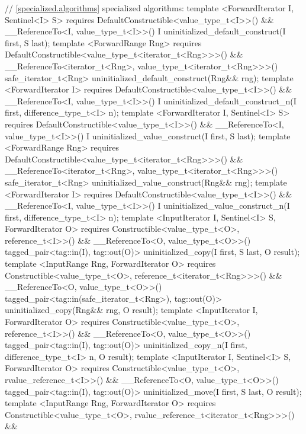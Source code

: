{\color{addclr}
\begin{codeblock}
// \ref{specialized.algorithms} specialized algorithms:
template <ForwardIterator I, Sentinel<I> S>
  requires DefaultConstructible<value_type_t<I>>() &&
           __ReferenceTo<I, value_type_t<I>>()
    I uninitialized_default_construct(I first, S last);
template <ForwardRange Rng>
  requires DefaultConstructible<value_type_t<iterator_t<Rng>>>() &&
           __ReferenceTo<iterator_t<Rng>, value_type_t<iterator_t<Rng>>>()
    safe_iterator_t<Rng>
    uninitialized_default_construct(Rng&& rng);
template <ForwardIterator I>
  requires DefaultConstructible<value_type_t<I>>() &&
           __ReferenceTo<I, value_type_t<I>>()
    I uninitialized_default_construct_n(I first, difference_type_t<I> n);
template <ForwardIterator I, Sentinel<I> S>
  requires DefaultConstructible<value_type_t<I>>() &&
           __ReferenceTo<I, value_type_t<I>>()
    I uninitialized_value_construct(I first, S last);
template <ForwardRange Rng>
  requires DefaultConstructible<value_type_t<iterator_t<Rng>>>() &&
           __ReferenceTo<iterator_t<Rng>, value_type_t<iterator_t<Rng>>>()
    safe_iterator_t<Rng>
    uninitialized_value_construct(Rng&& rng);
template <ForwardIterator I>
  requires DefaultConstructible<value_type_t<I>>() &&
           __ReferenceTo<I, value_type_t<I>>()
    I uninitialized_value_construct_n(I first, difference_type_t<I> n);
template <InputIterator I, Sentinel<I> S, ForwardIterator O>
  requires Constructible<value_type_t<O>, reference_t<I>>() &&
           __ReferenceTo<O, value_type_t<O>>()
    tagged_pair<tag::in(I), tag::out(O)>
    uninitialized_copy(I first, S last, O result);
template <InputRange Rng, ForwardIterator O>
  requires Constructible<value_type_t<O>, reference_t<iterator_t<Rng>>>() &&
           __ReferenceTo<O, value_type_t<O>>()
    tagged_pair<tag::in(safe_iterator_t<Rng>), tag::out(O)>
    uninitialized_copy(Rng&& rng, O result);
template <InputIterator I, ForwardIterator O>
  requires Constructible<value_type_t<O>, reference_t<I>>() &&
           __ReferenceTo<O, value_type_t<O>>()
    tagged_pair<tag::in(I), tag::out(O)>
    uninitialized_copy_n(I first, difference_type_t<I> n, O result);
template <InputIterator I, Sentinel<I> S, ForwardIterator O>
  requires Constructible<value_type_t<O>, rvalue_reference_t<I>>() &&
           __ReferenceTo<O, value_type_t<O>>()
    tagged_pair<tag::in(I), tag::out(O)> uninitialized_move(I first, S last, O result);
template <InputRange Rng, ForwardIterator O>
  requires Constructible<value_type_t<O>, rvalue_reference_t<iterator_t<Rng>>>() &&

\end{codeblock}}

